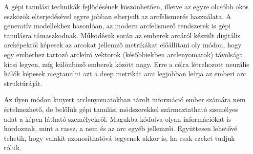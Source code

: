 


A gépi tanulási technikák fejlődésének köszönhetően, illetve az egyre olcsóbb okos eszközök elterjedésével egyre jobban elterjedt az arcfelismerés használata. A generatív modellekhez hasonlóan, az modern arcfelismerő rendszerek is gépi tanulásra támaszkodnak. Működésük során az emberek arcáról készült digitális arcképekről képesek az arcokat jellemző metrikákat előállítani oly módon, hogy egy emberhez tartozó arcleíró vektorok (későbbiekben arclenyomatok) távolsága kicsi legyen, míg különböző emberek között nagy. Erre a célra létrehozott neurális hálók képesek megtanulni azt a deep metrikát ami legjobban leírja az emberi arc struktúráját.


Az ilyen módon kinyert arclenyomatokban tárolt információ ember számára nem értelmezhető, de belőlük gépi tanulási módszerekkel származtatható személyes adat a képen látható személyekről. Magukba kódolva olyan információkat is hordoznak, mint a rassz, a nem és az arc egyéb jellemzői. Együttesen lehetővé tehetik, hogy valakit azonosíthatóvá tegyenek akkor is, ha csak ezeket tudjuk róluk.


